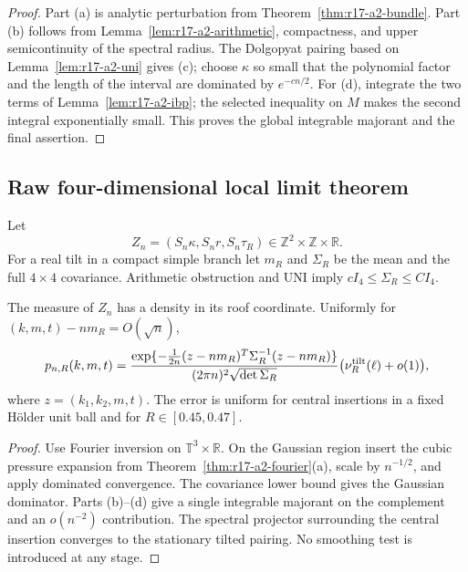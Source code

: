 \begin{proof}
Part (a) is analytic perturbation from
Theorem~\ref{thm:r17-a2-bundle}.  Part (b) follows from
Lemma~\ref{lem:r17-a2-arithmetic}, compactness, and upper semicontinuity of the
spectral radius.  The Dolgopyat pairing based on
Lemma~\ref{lem:r17-a2-uni} gives (c); choose \(\kappa\) so small that the
polynomial factor and the length of the interval are dominated by
\(e^{-cn/2}\).  For (d), integrate the two terms of
Lemma~\ref{lem:r17-a2-ibp}; the selected inequality on \(M\) makes the second
integral exponentially small.  This proves the global integrable majorant and
the final assertion.
\end{proof}

\subsection{Raw four-dimensional local limit theorem}

Let
\[
 Z_n=(S_n\kappa,S_nr,S_n\tau_R)
 \in\mathbb Z^2\times\mathbb Z\times\mathbb R.
\]
For a real tilt in a compact simple branch let \(m_R\) and \(\Sigma_R\) be
the mean and the full \(4\times4\) covariance.  Arithmetic obstruction and
UNI imply \(cI_4\le\Sigma_R\le CI_4\).

\begin{theorem}
\label{thm:r17-a2-llt}
The measure of \(Z_n\) has a density in its roof coordinate.  Uniformly for
\((k,m,t)-nm_R=O(\sqrt n)\),
\[
 p_{n,R}(k,m,t)
 ={\exp\{-\tfrac1{2n}(z-nm_R)^T\Sigma_R^{-1}(z-nm_R)\}
   \over (2\pi n)^2\sqrt{\det\Sigma_R}}
 \bigl(\nu_R^{\rm tilt}(\ell)+o(1)\bigr),
\]
where \(z=(k_1,k_2,m,t)\).  The error is uniform for central insertions in a
fixed H\"older unit ball and for \(R\in[0.45,0.47]\).
\end{theorem}

\begin{proof}
Use Fourier inversion on \(\mathbb T^3\times\mathbb R\).  On the Gaussian
region insert the cubic pressure expansion from
Theorem~\ref{thm:r17-a2-fourier}(a), scale by \(n^{-1/2}\), and apply
dominated convergence.  The covariance lower bound gives the Gaussian
dominator.  Parts (b)--(d) give a single integrable majorant on the complement
and an \(o(n^{-2})\) contribution.  The spectral projector surrounding the
central insertion converges to the stationary tilted pairing.  No smoothing
test is introduced at any stage.
\end{proof}

